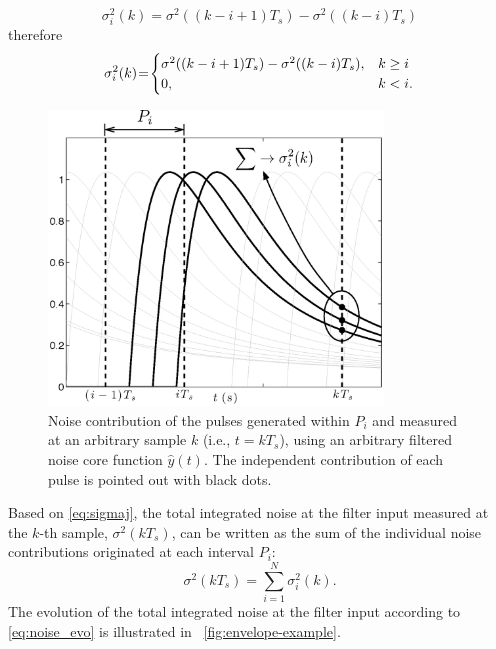 \begin{equation}
		\sigma_i^2(k) = \sigma^2\left(\left(k-i+1\right)T_s\right)-\sigma^2\left(\left(k-i\right)T_s\right) 
		\label{eq:ap4}
\end{equation}
therefore
\begin{equation}
  \sigma_i^2(k) \hspace{-0.2em}=\hspace{-0.2em} 
  \begin{cases}
     \sigma^2((k-i+1)T_s)-\sigma^2((k-i)T_s ), & k \geq i   \\
      0, &   k < i.
  \end{cases}\label{eq:sigmaj}
\end{equation}

\begin{figure}[!t]
	\centering
	\includegraphics[width=3.5in]{./Figures/sequence.eps}
	\caption{Noise contribution of the pulses generated within $P_i$ and measured at an arbitrary sample $k$ (i.e., $t=kT_s$), using an arbitrary filtered noise core function $\hat{y}(t)$. The independent contribution of each pulse is pointed out with black dots.}\label{fig:sequence}
\end{figure}

Based on \eqref{eq:sigmaj}, the total integrated noise at the filter input measured at the \mbox{$k$-th} sample, $\sigma^2(kT_s)$, can be written as the sum of the individual noise contributions originated at each interval $P_i$:
\begin{equation}
\sigma^2(kT_s) = \sum_{i=1}^{N} \sigma_i^2(k). \label{eq:noise_evo}
\end{equation}
The evolution of the total integrated noise at the filter input according to \eqref{eq:noise_evo} is illustrated in \figurename~\ref{fig:envelope-example}. 

